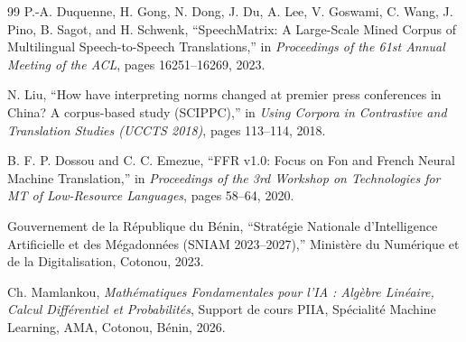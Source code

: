 \documentclass[10pt,a4paper,twocolumn]{article}
\begin{document}
\begin{thebibliography}{99}
P.-A. Duquenne, H. Gong, N. Dong, J. Du, A. Lee, V. Goswami, C. Wang, J. Pino, B. Sagot, and H. Schwenk,
\newblock ``SpeechMatrix: A Large-Scale Mined Corpus of Multilingual Speech-to-Speech Translations,''
\newblock in \textit{Proceedings of the 61st Annual Meeting of the ACL}, pages 16251--16269, 2023.

N. Liu,
\newblock ``How have interpreting norms changed at premier press conferences in China? A corpus-based study (SCIPPC),''
\newblock in \textit{Using Corpora in Contrastive and Translation Studies (UCCTS 2018)}, pages 113--114, 2018.

B. F. P. Dossou and C. C. Emezue,
\newblock ``FFR v1.0: Focus on Fon and French Neural Machine Translation,''
\newblock in \textit{Proceedings of the 3rd Workshop on Technologies for MT of Low-Resource Languages}, pages 58--64, 2020.

Gouvernement de la République du Bénin,
\newblock ``Stratégie Nationale d'Intelligence Artificielle et des Mégadonnées (SNIAM 2023--2027),''
\newblock Ministère du Numérique et de la Digitalisation, Cotonou, 2023.

Ch. Mamlankou,
\newblock \textit{Mathématiques Fondamentales pour l'IA : Algèbre Linéaire, Calcul Différentiel et Probabilités},
\newblock Support de cours PIIA, Spécialité Machine Learning, AMA, Cotonou, Bénin, 2026.
\end{thebibliography}
\end{document}
